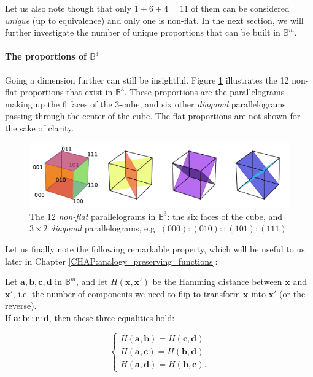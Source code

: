 Let us also note though that only $1 + 6 + 4 = 11$ of them can be considered
\textit{unique} (up to equivalence) and only one is non-flat. In the next
section, we will further investigate the number of unique proportions that can
be built in $\mathbb{B}^m$.

\paragraph{The proportions of $\mathbb{B}^3$\\}

Going a dimension further can still be insightful. Figure \ref{FIG:cubes_in_B3}
illustrates the 12 non-flat proportions that exist in $\mathbb{B}^3$. These
proportions are the parallelograms making up the 6 faces of the $3$-cube, and
six other \textit{diagonal} parallelograms passing through the center of the
cube.  The flat proportions are not shown for the sake of clarity.

\begin{figure}[!h]
\centering
\includegraphics[width=\linewidth]{figures/cubes_in_B3.pdf}
  \caption{The $12$ \textit{non-flat} parallelograms in $\mathbb{B}^3$: the
  six faces of the cube, and $3 \times 2$ \textit{diagonal} parallelograms,
  e.g. $(000) : (010) :: (101) : (111)$.}
\label{FIG:cubes_in_B3}
\end{figure}

Let us finally note the following remarkable property, which will be useful to
us later in Chapter \ref{CHAP:analogy_preserving_functions}:

\begin{property}
  \label{PROPER:hamming_distance_boolean_proportion}
  Let $\mathbf{a}, \mathbf{b},\mathbf{c}, \mathbf{d}$ in $\mathbb{B}^m$, and
  let $H(\mathbf{x}, \mathbf{x'})$ be the Hamming distance between $\mathbf{x}$
  and $\mathbf{x'}$, i.e. the number of components we need to flip to transform
  $\mathbf{x}$ into $\mathbf{x'}$ (or the reverse).\\
  If $\mathbf{a} : \mathbf{b}
  :: \mathbf{c} : \mathbf{d}$, then these three equalities hold:

  $$
  \begin{cases}
    H(\mathbf{a}, \mathbf{b}) = H(\mathbf{c}, \mathbf{d})\\
    H(\mathbf{a}, \mathbf{c}) = H(\mathbf{b}, \mathbf{d})\\
    H(\mathbf{a}, \mathbf{d}) = H(\mathbf{b}, \mathbf{c}).
  \end{cases}
  $$
\end{property}

